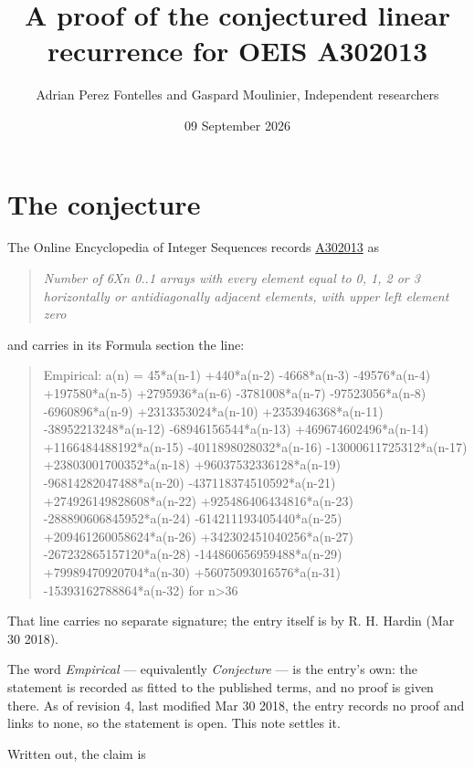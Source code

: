 \documentclass[11pt]{article}
\title{A proof of the conjectured linear recurrence for OEIS A302013}
\author{Adrian Perez Fontelles and Gaspard Moulinier, Independent researchers}
\date{09 September 2026}
\theoremstyle{definition}
\begin{document}
\maketitle
\section{The conjecture}

The Online Encyclopedia of Integer Sequences records \href{https://oeis.org/A302013}{A302013} as

\begin{quote}\itshape Number of 6Xn 0..1 arrays with every element equal to 0, 1, 2 or 3 horizontally or antidiagonally adjacent elements, with upper left element zero\end{quote}

and carries in its Formula section the line:

\begin{quote}\ttfamily Empirical: a(n) = 45*a(n-1) +440*a(n-2) -4668*a(n-3) -49576*a(n-4) +197580*a(n-5) +2795936*a(n-6) -3781008*a(n-7) -97523056*a(n-8) -6960896*a(n-9) +2313353024*a(n-10) +2353946368*a(n-11) -38952213248*a(n-12) -68946156544*a(n-13) +469674602496*a(n-14) +1166484488192*a(n-15) -4011898028032*a(n-16) -13000611725312*a(n-17) +23803001700352*a(n-18) +96037532336128*a(n-19) -96814282047488*a(n-20) -437118374510592*a(n-21) +274926149828608*a(n-22) +925486406434816*a(n-23) -288890606845952*a(n-24) -614211193405440*a(n-25) +209461260058624*a(n-26) +342302451040256*a(n-27) -267232865157120*a(n-28) -144860656959488*a(n-29) +79989470920704*a(n-30) +56075093016576*a(n-31) -15393162788864*a(n-32) for n>36\end{quote}

That line carries no separate signature; the entry itself is by R. H. Hardin (Mar 30 2018).

The word {\itshape Empirical} --- equivalently {\itshape Conjecture} --- is the entry's own: the statement is recorded as fitted to the published terms, and no proof is given there. As of revision 4, last modified Mar 30 2018, the entry records no proof and links to none, so the statement is open. This note settles it.

Written out, the claim is
\end{document}
